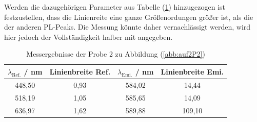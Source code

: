 Werden die dazugeh\"{o}rigen Parameter aus Tabelle (\ref{tab:auf2b}) hinzugezogen ist festzustellen, dass die Linienreite eine ganze Gr\"{o}{\ss}enordungen gr\"{o}{\ss}er ist, als die der anderen PL-Peaks.
Die Messung k\"{o}nnte daher vernachl\"{a}ssigt werden, wird hier jedoch der Vollst\"{a}ndigkeit halber mit angegeben.
\begin{table}
	\centering
	\caption{Messergebnisse der Probe 2 zu Abbildung (\ref{abb:auf2P2})}
\begin{tabular}{|cccc|}
	\hline
	{$\lambda_{\text{Ref.}}$ / nm}	&	{Linienbreite Ref.}	&	{$\lambda_{\text{Emi.}}$ / nm}	&	{Linienbreite Emi.}	\\
	\hline
	448,50 & 0,93 & 584,02 & 14,44 \\
	518,19 & 1,05 & 585,65 & 14,09 \\
	636,97 & 1,62 & 589,88 & 109,10 \\
	\hline
	\end{tabular}
\label{tab:auf2b}
\end{table}

